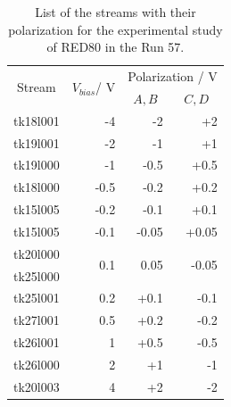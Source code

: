 \begin{table}[]
\centering
\begin{tabular}{c|rrr}
\multicolumn{1}{c|}{\multirow{2}{*}{Stream}} & \multicolumn{1}{c}{\multirow{2}{*}{$V_{bias}$/ V}} & \multicolumn{2}{|c}{Polarization / V}              \\ \cline{3-4} 
\multicolumn{1}{c|}{}                        & \multicolumn{1}{c|}{}                               & \multicolumn{1}{c|}{$A,B$} & \multicolumn{1}{c}{$C,D$} \\ \hline \hline
tk18l001 & -4   & -2    & +2    \\ \hline
tk19l001 & -2   & -1    & +1    \\ \hline
tk19l000 & -1   & -0.5  & +0.5  \\ \hline
tk18l000 & -0.5 & -0.2  & +0.2  \\ \hline
tk15l005 & -0.2 & -0.1  & +0.1  \\ \hline
tk15l005 & -0.1 & -0.05 & +0.05 \\ \hline
tk20l000                                     & \multirow{2}{*}{0.1}                                & \multirow{2}{*}{0.05}    & \multirow{2}{*}{-0.05}  \\
tk25l000 &      &       &       \\ \hline
tk25l001 & 0.2  & +0.1  & -0.1  \\ \hline
tk27l001 & 0.5  & +0.2  & -0.2  \\ \hline
tk26l001 & 1    & +0.5  & -0.5  \\ \hline
tk26l000 & 2    & +1    & -1    \\ \hline
tk20l003 & 4    & +2    & -2   
\end{tabular}%
\caption{List of the streams with their polarization for the experimental study of RED80 in the Run 57.}
\label{tab:red80-stream-list}
\end{table}

